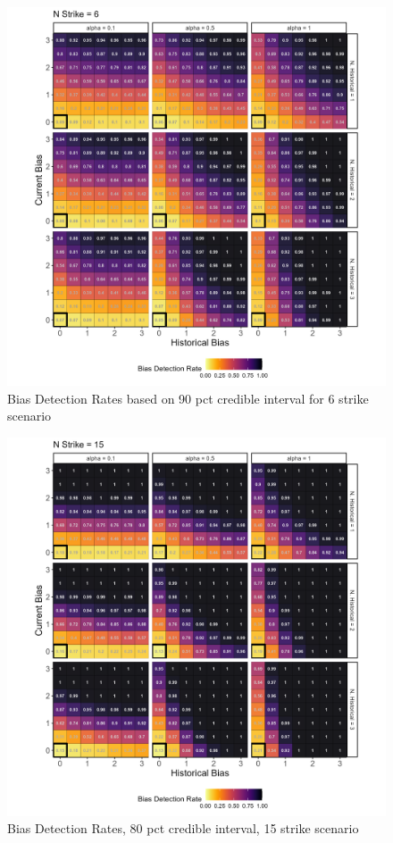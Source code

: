 \documentclass[12pt]{article}
\begin{document}
\begin{figure}

{\centering \includegraphics[width=0.95\linewidth]{../figures/pp6_90CI} 

}

\caption{Bias Detection Rates based on 90 pct credible interval for 6 strike scenario}\label{fig:figbd906}
\end{figure}

\begin{figure}

{\centering \includegraphics[width=0.95\linewidth]{../figures/pp15_80CI} 

}

\caption{Bias Detection Rates, 80 pct credible interval, 15 strike scenario}\label{fig:figbd8015}
\end{figure}
\end{document}
